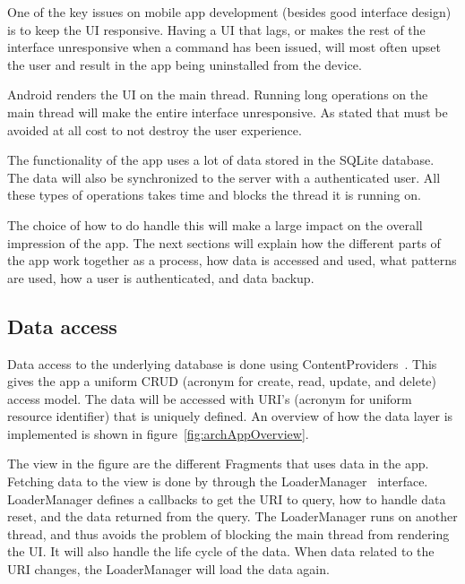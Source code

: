 One of the key issues on mobile app development (besides good interface design) is to keep the \gls{UI} responsive. Having a UI that lags, or makes the rest of the interface unresponsive when a command has been issued, will most often upset the user and result in the app being uninstalled from the device.

Android renders the UI on the main thread. Running long operations on the main thread will make the entire interface unresponsive. As stated that must be avoided at all cost to not destroy the user experience. 

The functionality of the app uses a lot of data stored in the SQLite database. The data will also be synchronized to the server with a authenticated user. All these types of operations takes time and blocks the thread it is running on.

The choice of how to do handle this will make a large impact on the overall impression of the app. The next sections will explain how the different parts of the app work together as a process, how data is accessed and used, what patterns are used, how a user is authenticated, and data backup.


\subsection{Data access}
Data access to the underlying database is done using ContentProviders~\cite{contentproviders}. This gives the app a uniform \gls{CRUD} (acronym for create, read, update, and delete) access model. The data will be accessed with \gls{URI}'s (acronym for uniform resource identifier) that is uniquely defined. An overview of how the data layer is implemented is shown in figure~\ref{fig:archAppOverview}.

The view in the figure are the different Fragments that uses data in the app. Fetching data to the view is done by through the LoaderManager~\cite{loadermanager} interface. LoaderManager  defines a callbacks to get the URI to query, how to handle data reset, and the data returned from the query. The LoaderManager runs on another thread, and thus avoids the problem of blocking the main thread from rendering the UI. It will also handle the life cycle of the data. When data related to the URI changes, the LoaderManager will load the data again. 

